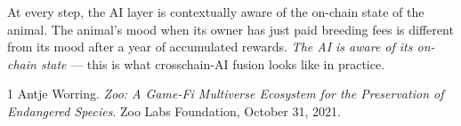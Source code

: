 \documentclass[11pt,letterpaper]{article}
\begin{document}
At every step, the AI layer is contextually aware of the on-chain state of the animal. The animal's mood when its owner has just paid breeding fees is different from its mood after a year of accumulated rewards. \emph{The AI is aware of its on-chain state} --- this is what crosschain-AI fusion looks like in practice.

\begin{thebibliography}{1}
 Antje Worring. \emph{Zoo: A Game-Fi Multiverse Ecosystem for the Preservation of Endangered Species}. Zoo Labs Foundation, October 31, 2021.
\end{thebibliography}
\end{document}
